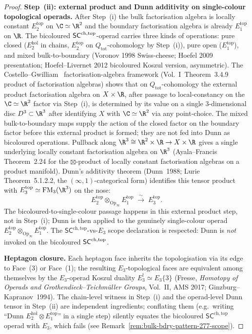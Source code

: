 \begin{proof}
\medskip\noindent\textbf{Step~(ii): external product and Dunn
additivity on single-colour topological operads.} After Step~(i) the bulk
factorisation algebra is locally constant $E_2^{\mathrm{top}}$ on
$\C\simeq\R^2$ and the boundary factorisation algebra is already
$E_1^{\mathrm{top}}$ on $\R$. The bicoloured $\mathsf{SC}^{\mathrm{ch},\mathrm{top}}$-operad
carries three kinds of operations: pure closed ($E_2^{\mathrm{hol}}$
in chains, $E_2^{\mathrm{top}}$ on $Q_{\mathrm{tot}}$-cohomology by
Step~(i)), pure open ($E_1^{\mathrm{top}}$), and mixed
bulk-to-boundary (Voronov 1998 Swiss-cheese; Hoefel 2009 presentation;
Hoefel--Livernet 2012 bicoloured Koszul version, asymmetric). The
Costello--Gwilliam~\cite{CG21} factorisation-algebra framework
(Vol.~I~Theorem~3.4.9 product of factorisation algebras) shows that
on $Q_{\mathrm{tot}}$-cohomology the external product factorisation algebra
on $X\times\R$, after passage to local-constancy on the
$\C\simeq\R^2$ factor via Step~(i), is determined by its value on
a single $3$-dimensional disc $D^3\subset\R^3$ after identifying
$X$ with $\C\simeq\R^2$ via any point-choice. The mixed
bulk-to-boundary maps supply the action of the closed factor on the
boundary factor before this external product is formed; they are not
fed into Dunn as bicoloured operations. Pullback along
$\R^3\cong\R^2\times\R\to X\times\R$ gives a single underlying
locally constant factorisation algebra on $\R^3$
(Ayala--Francis~\cite{AF15}\,Theorem~2.24 for the $\boxtimes$-product
of locally constant factorisation algebras on a product manifold).
Dunn's additivity
theorem (Dunn~1988; Lurie~\cite{HA}\,Theorem~5.1.2.2, the
$(\infty,1)$-categorical form) identifies this tensor product with
$E_3^{\mathrm{top}}\simeq\FM_3(\R^3)$ on the nose:
\[
 E_2^{\mathrm{top}}\otimes_{\mathrm{Op}_{\infty}}E_1^{\mathrm{top}}
 \;\xrightarrow{\;\sim\;}\;
 E_3^{\mathrm{top}}.
\]
The bicoloured-to-single-colour passage happens in this external
product step, not in Step~(i); Dunn is then applied to the genuinely
single-colour operad
$E_2^{\mathrm{top}}\otimes_{\mathrm{Op}_\infty} E_1^{\mathrm{top}}$.
The $\mathsf{SC}^{\mathrm{ch,top}}$-vs-$E_3$ scope declaration is
respected: Dunn is \emph{not} invoked on the bicoloured
$\mathsf{SC}^{\mathrm{ch},\mathrm{top}}$.

\medskip\noindent\textbf{Heptagon closure.}
Each heptagon face inherits the topologisation via its edge to
Face~(3) or Face~(1); the resulting $E_3$-topological faces are
equivalent among themselves by the $E_3$-operad Koszul duality
$E_3^!\simeq E_3\{3\}$ (Fresse, \emph{Homotopy of Operads and
Grothendieck--Teichm\"uller Groups}, Vol.~II, AMS 2017;
Ginzburg--Kapranov~1994). The chain-level witness in Step~(i) and
the operad-level Dunn tensor in Step~(ii) are independent
ingredients; conflating them (e.g.\ writing
``Dunn $E_2^{\mathrm{hol}}\otimes E_1^{\mathrm{top}}$'' in a single
step) silently equates the bicoloured $\mathsf{SC}^{\mathrm{ch,top}}$
operad with $E_3$, which fails (see
Remark~\ref{rem:bulk-bdry-pattern-277-scope}).
\end{proof}


